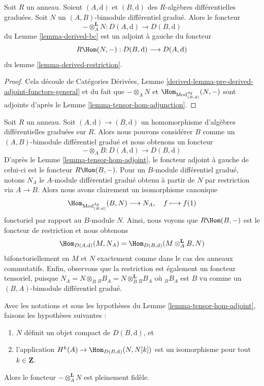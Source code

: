 \begin{lemma}
\label{lemma-tensor-hom-adjoint}
Soit $R$ un anneau. Soient $(A, \text{d})$ et $(B, \text{d})$ des $R$-algèbres
différentielles graduées. Soit $N$ un $(A, B)$-bimodule différentiel gradué. Alors
le foncteur
$$
- \otimes_A^\mathbf{L} N : D(A, \text{d}) \longrightarrow D(B, \text{d})
$$
du Lemme \ref{lemma-derived-bc} est un adjoint à gauche du foncteur
$$
R\Hom(N, -) : D(B, \text{d}) \longrightarrow D(A, \text{d})
$$
du lemme \ref{lemma-derived-restriction}.
\end{lemma}

\begin{proof}
Cela découle de Catégories Dérivées, Lemme
\ref{derived-lemma-pre-derived-adjoint-functors-general} et du fait que $-
\otimes_A N$ et $\Hom_{\text{Mod}^{dg}_{(B, \text{d})}}(N, -)$ sont adjoints
d'après le Lemme \ref{lemma-tensor-hom-adjunction}.
\end{proof}

\begin{example}
\label{example-map-hom-tensor}
Soit $R$ un anneau. Soit $(A, \text{d}) \to (B, \text{d})$ un homomorphisme
d'algèbres différentielles graduées sur $R$. Alors nous pouvons considérer $B$ comme
un $(A, B)$-bimodule différentiel gradué et nous obtenons un foncteur
$$
- \otimes_A B : D(A, \text{d}) \longrightarrow D(B, \text{d})
$$
D'après le Lemme \ref{lemma-tensor-hom-adjoint}, le foncteur adjoint à gauche de
celui-ci est le foncteur $R\Hom(B, -)$. Pour un $B$-module différentiel gradué,
notons $N_A$ le $A$-module différentiel gradué obtenu à partir de $N$ par
restriction via $A \to B$. Alors nous avons clairement un isomorphisme canonique
$$
\Hom_{\text{Mod}^{dg}_{(B, \text{d})}}(B, N) \longrightarrow N_A,\quad
f \longmapsto f(1)
$$
fonctoriel par rapport au $B$-module $N$. Ainsi, nous voyons que $R\Hom(B, -)$ est le
foncteur de restriction et nous obtenons
$$
\Hom_{D(A, \text{d})}(M, N_A) =
\Hom_{D(B, \text{d})}(M \otimes^\mathbf{L}_A B, N)
$$
bifonctoriellement en $M$ et $N$ exactement comme dans le cas des anneaux
commutatifs. Enfin, observons que la restriction est également un foncteur
tensoriel, puisque $N_A = N \otimes_B {}_BB_A = N \otimes_B^\mathbf{L} {}_BB_A$ où
${}_BB_A$ est $B$ vu comme un $(B, A)$-bimodule différentiel gradué.
\end{example}

\begin{lemma}
\label{lemma-tensor-with-compact-fully-faithful}
Avec les notations et sous les hypothèses du Lemme
\ref{lemma-tensor-hom-adjoint}, faisons les hypothèses suivantes :
\begin{enumerate}
\item $N$ définit un objet compact de $D(B, \text{d})$, et
\item l'application $H^k(A) \to \Hom_{D(B, \text{d})}(N, N[k])$ est un
isomorphisme pour tout $k \in \mathbf{Z}$.
\end{enumerate}
Alors le foncteur $-\otimes_A^\mathbf{L} N$ est pleinement fidèle.
\end{lemma}

